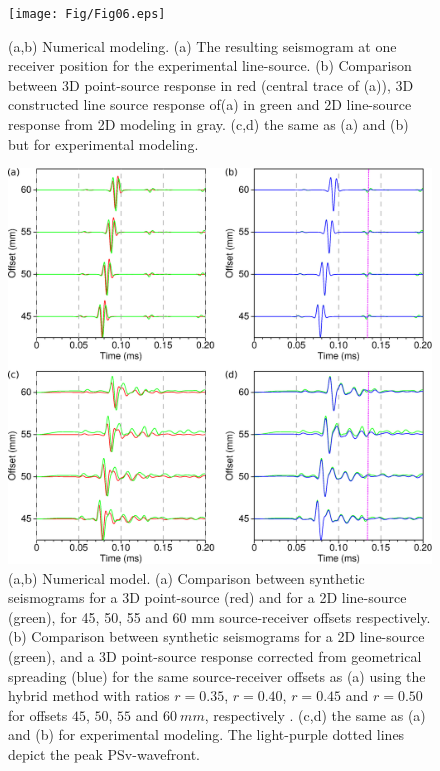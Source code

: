 \documentclass[extra,mreferee]{gji}
\begin{document}
\clearpage
\newpage

\begin{figure}
\centering
\texttt{[image: Fig/Fig06.eps]}
\caption{(a,b) Numerical modeling. (a) The resulting seismogram at one receiver position for the experimental line-source. (b) Comparison between 3D point-source response in red (central trace of (a)), 3D constructed line source response of(a) in green and 2D line-source response from 2D modeling in gray. (c,d) the same as (a) and (b) but for experimental modeling.}
\label{Fig:Fig06}
\end{figure}

\clearpage
\newpage

\begin{figure}
\centering
\includegraphics[width=1.0\columnwidth]{Fig/Fig07.eps}
\caption{(a,b) Numerical model. (a) Comparison between synthetic seismograms for a 3D point-source (red) and for a 2D line-source (green), for 45, 50, 55 and 60 mm source-receiver offsets respectively. (b) Comparison between synthetic seismograms for a 2D line-source (green), and a 3D point-source response corrected from geometrical spreading (blue) for the same source-receiver offsets as (a) using the hybrid method with ratios $r=0.35$, $r=0.40$, $r=0.45$ and $r=0.50$ for offsets $45$, $50$, $55$ and $60\ mm$, respectively . (c,d) the same as (a) and (b) for experimental modeling. The light-purple dotted lines depict the peak PSv-wavefront.}%
\label{Fig:Fig07}
\end{figure}
\end{document}
